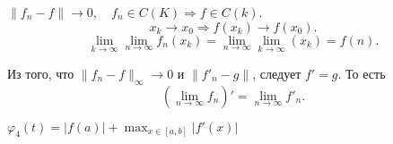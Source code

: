 \begin{rem}
    $ \| f_n - f \|  \to  0, \quad f_n \in C(K) \Longrightarrow f \in C(k) $.
    $$ x_k \to  x_0 \Longrightarrow f(x_k) \to  f(x_0).$$
    \[
	\lim_{k \to  \infty} \lim_{n \to \infty} f_n(x_k) = \lim_{n \to \infty} \lim_{k \to \infty} (x_k)  = f(n)
    .\] 
\end{rem}
\begin{rem}
    Из того, что $ \| f_n - f \| _{\infty} \to  0$ и $ \| f'_n - g \|$, следует  $ f' = g$.
    То есть 
     \[
	 \left( \lim_{n \to \infty} f_n \right) ' = \lim_{n \to \infty} f'_n
    .\] 
\end{rem}
\begin{prac}
    $ \varphi_4(t) = \left| f(a) \right|  + \max_{x \in  [a, b]} \left| f'(x) \right| $
\end{prac}
% 
